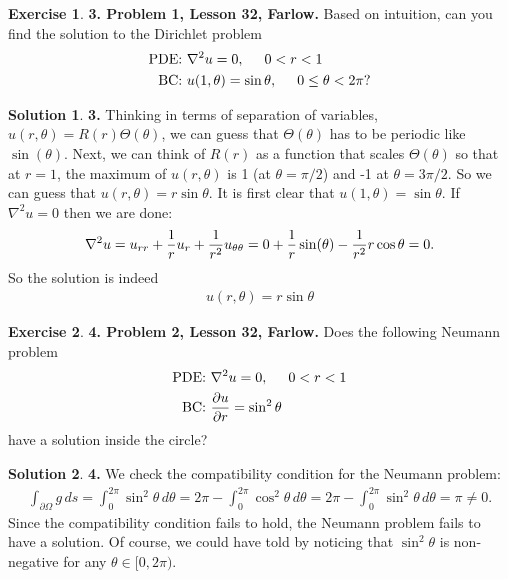 \documentclass{article}
\theoremstyle{definition}
\newtheorem*{exer*}{Exercise}
\newtheorem*{sln*}{Solution}
\newcommand{\p}{\partial}
\newcommand{\f}[2]{\frac{#1}{#2}}
\begin{document}
\begin{exer*}\textbf{3. Problem 1, Lesson 32, Farlow.} Based on intuition, can you find the solution to the Dirichlet problem 
	\begin{align*}
	\text{PDE: } &\laplacian u = 0, \hspace{0.5cm} 0 < r < 1\\
	\text{BC: }  &u(1,\theta) = \sin\theta, \hspace{0.5cm} 0 \leq \theta < 2\pi? 
	\end{align*}
	
	\begin{sln*}\textbf{3. }
		Thinking in terms of separation of variables, $u(r,\theta) = R(r)\Theta(\theta)$, we can guess that $\Theta(\theta)$ has to be periodic like $\sin(\theta)$. Next, we can think of $R(r)$ as a function that scales $\Theta(\theta)$ so that at $r = 1$, the maximum of $u(r,\theta)$ is 1 (at $\theta = \pi/2$) and -1 at $\theta = 3\pi/2$. So we can guess that $u(r,\theta) = r\sin\theta$. It is first clear that $u(1,\theta) = \sin\theta$. If $\nabla^2 u = 0 $ then we are done:
		\begin{align*}
		\laplacian u = u_{rr} + \f{1}{r}u_r + \f{1}{r^2}u_{\theta\theta}= 0 + \f{1}{r}\sin(\theta) - \f{1}{r^2}r\cos\theta = 0.
		\end{align*}
		So the solution is indeed
		\begin{align*}
		\boxed{u(r,\theta) = r\sin\theta}
		\end{align*}
	\end{sln*}
\end{exer*}




\newpage

\begin{exer*}\textbf{4. Problem 2, Lesson 32, Farlow.} Does the following Neumann problem
	\begin{align*}
	\text{PDE: } &\laplacian u = 0, \hspace{0.5cm} 0 < r < 1\\
	\text{BC: } &\f{\p u}{\p r} = \sin^2\theta
	\end{align*}
have a solution inside the circle?
	
	\begin{sln*}\textbf{4. }
		We check the compatibility condition for the Neumann problem:
		\begin{align*}
		\int_{\p \Omega} g\,ds = \int^{2\pi}_0 \sin^2\theta \, d\theta = 2\pi - \int^{2\pi}_0\cos^2\theta\,d\theta = 2\pi - \int^{2\pi}_0 \sin^2\theta\,d\theta = \pi \neq 0.
		\end{align*}
		Since the compatibility condition fails to hold, the Neumann problem fails to have a solution. Of course, we could have told by noticing that $\sin^2\theta$ is non-negative for any $\theta \in [0,2\pi)$. 
	\end{sln*}
\end{exer*}
\end{document}
